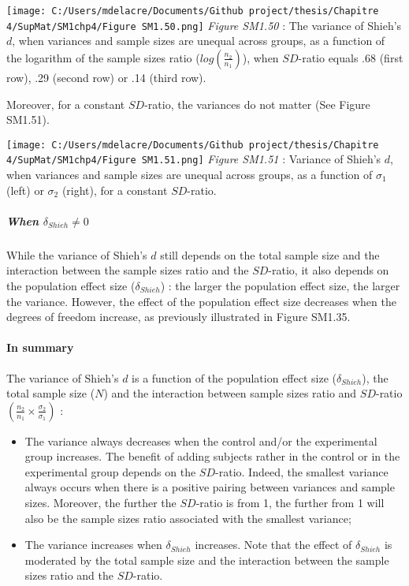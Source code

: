 \documentclass[
  english,
  man,mask,floatsintext]{apa6}
\let\oldparagraph\paragraph
\renewcommand{\paragraph}[1]{\oldparagraph{#1}\mbox{}}
\let\oldsubparagraph\subparagraph
\renewcommand{\subparagraph}[1]{\oldsubparagraph{#1}\mbox{}}
\begin{document}
\texttt{[image: C:/Users/mdelacre/Documents/Github project/thesis/Chapitre 4/SupMat/SM1chp4/Figure SM1.50.png]}
\emph{Figure SM1.50} : The variance of Shieh's \(d\), when variances and sample sizes are unequal across groups, as a function of the logarithm of the sample sizes ratio (\(log \left( \frac{n_2}{n_1} \right)\)), when \(SD\)-ratio equals .68 (first row), .29 (second row) or .14 (third row).

\newpage

Moreover, for a constant \(SD\)-ratio, the variances do not matter (See Figure SM1.51).

\texttt{[image: C:/Users/mdelacre/Documents/Github project/thesis/Chapitre 4/SupMat/SM1chp4/Figure SM1.51.png]}
\emph{Figure SM1.51} : Variance of Shieh's \(d\), when variances and sample sizes are unequal across groups, as a function of \(\sigma_1\) (left) or \(\sigma_2\) (right), for a constant \(SD\)-ratio.

\hypertarget{when-delta_shieh-neq-0-2}{%
\subparagraph{\texorpdfstring{When \(\delta_{Shieh} \neq 0\)}{When \textbackslash delta\_\{Shieh\} \textbackslash neq 0}}\label{when-delta_shieh-neq-0-2}}

While the variance of Shieh's \(d\) still depends on the total sample size and the interaction between the sample sizes ratio and the \(SD\)-ratio, it also depends on the population effect size (\(\delta_{Shieh}\)) : the larger the population effect size, the larger the variance. However, the effect of the population effect size decreases when the degrees of freedom increase, as previously illustrated in Figure SM1.35.

\newpage

\hypertarget{in-summary-4}{%
\paragraph{In summary}\label{in-summary-4}}

The variance of Shieh's \(d\) is a function of the population effect size (\(\delta_{Shieh}\)), the total sample size (\(N\)) and the interaction between sample sizes ratio and \(SD\)-ratio \(\left(\frac{n_2}{n_1}\times\frac{\sigma_2}{\sigma_1} \right)\) :

\begin{itemize}
\item
  The variance always decreases when the control and/or the experimental group increases. The benefit of adding subjects rather in the control or in the experimental group depends on the \(SD\)-ratio. Indeed, the smallest variance always occurs when there is a positive pairing between variances and sample sizes. Moreover, the further the \(SD\)-ratio is from 1, the further from 1 will also be the sample sizes ratio associated with the smallest variance;
\item
  The variance increases when \(\delta_{Shieh}\) increases. Note that the effect of \(\delta_{Shieh}\) is moderated by the total sample size and the interaction between the sample sizes ratio and the \(SD\)-ratio.
\end{itemize}
\end{document}
